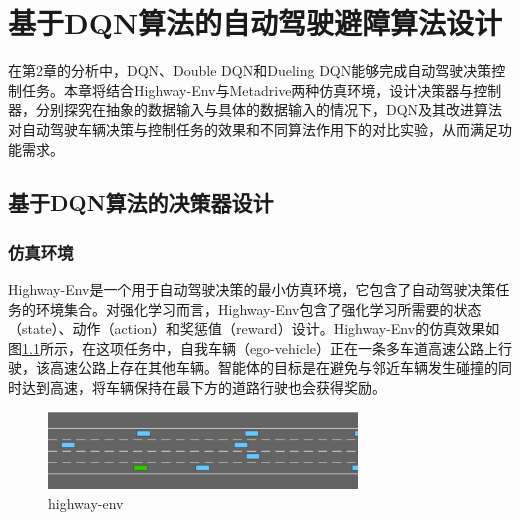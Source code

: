 %
%
%
%
%

\chapter{基于DQN算法的自动驾驶避障算法设计}

在第2章的分析中，DQN、Double DQN和Dueling DQN能够完成自动驾驶决策控制任务。本章将结合Highway-Env与Metadrive两种仿真环境，设计决策器与控制器，分别探究在抽象的数据输入与具体的数据输入的情况下，DQN及其改进算法对自动驾驶车辆决策与控制任务的效果和不同算法作用下的对比实验，从而满足功能需求。

\section{基于DQN算法的决策器设计}\label{3.1基于DQN算法的决策器设计} %

\subsection{仿真环境}\label{3.1.1仿真环境}

Highway-Env是一个用于自动驾驶决策的最小仿真环境\cite{highway-env}，它包含了自动驾驶决策任务的环境集合。对强化学习而言，Highway-Env包含了强化学习所需要的状态（state）、动作（action）和奖惩值（reward）设计。Highway-Env的仿真效果如图\ref{highway-env}所示，在这项任务中，自我车辆（ego-vehicle）正在一条多车道高速公路上行驶，该高速公路上存在其他车辆。智能体的目标是在避免与邻近车辆发生碰撞的同时达到高速，将车辆保持在最下方的道路行驶也会获得奖励。

\begin{figure}[htbp]
    \vspace{13pt}
    \centering
    \includegraphics[width=0.73\textwidth]{images/chapter3/highway-env.png}
    \caption{highway-env}\label{highway-env} %
\end{figure}  


